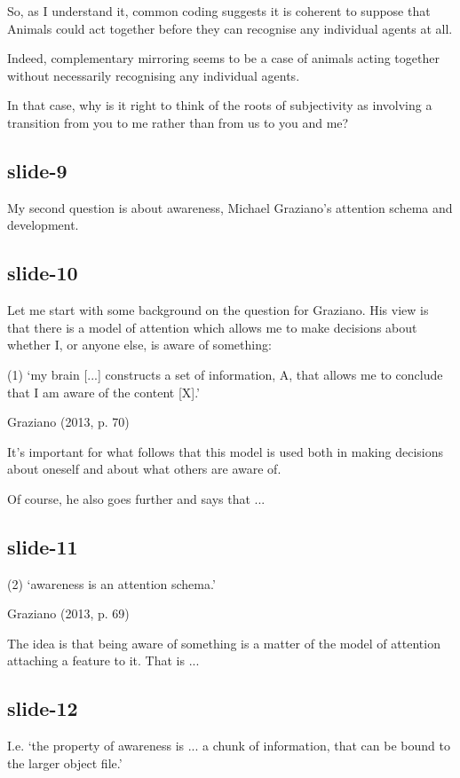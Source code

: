 \documentclass[14pt,\papersize]{extarticle}
\begin{document}
So, as I understand it,
common coding suggests it is coherent to suppose that 
Animals could act together before they can recognise any individual 
agents at all.
 
Indeed, complementary mirroring seems to be a case of animals acting
together without necessarily recognising any individual agents.
 
In that case, why is it right to think of the roots of subjectivity
as involving a transition from you to me rather than from us to you and me?
 
\subsection{slide-9}
My second question is about awareness, Michael Graziano’s attention
schema and development.
 
\subsection{slide-10}
Let me start with some background on the question for Graziano.
His view is that there is a model of attention which allows me 
to make decisions about whether I, or anyone else, is aware of something:
 
(1) ‘my brain [...] constructs a set of information, A, that allows me to 
conclude that I am aware of the content [X].’
            


            
Graziano (2013, p. 70)

 
It's important for what follows that this model is used both in
making decisions about oneself and about what others are aware of.
 
Of course, he also goes further and says that ...
 
\subsection{slide-11}
(2) ‘awareness is an attention schema.’
              


              
Graziano (2013, p. 69)

 
The idea is that being aware of something is a matter of the
model of attention attaching a feature to it.
That is ...
 
\subsection{slide-12}
I.e. ‘the property of awareness is ... a chunk of information, that can 
be bound to the larger 
object file.’
              
\end{document}
